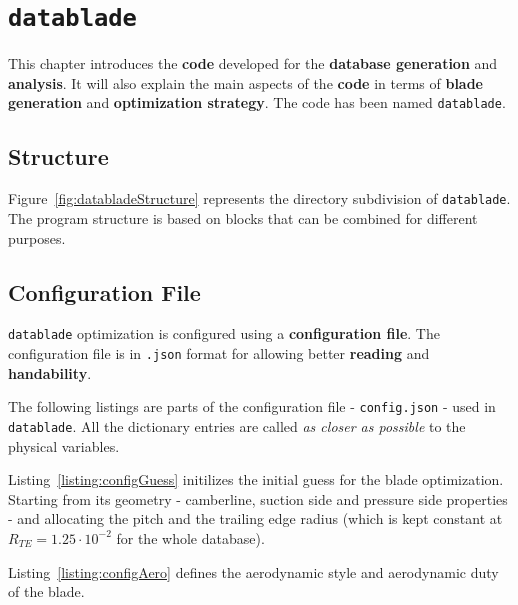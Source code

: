 \chapter{\texttt{datablade}}
\label{chapter:code}

This chapter introduces the \textbf{code} developed for the \textbf{database generation} and \textbf{analysis}. 
It will also explain the main aspects of the \textbf{code} in terms of \textbf{blade generation} and \textbf{optimization strategy}.
The code has been named \texttt{datablade}.

\section{Structure}

Figure~\ref{fig:databladeStructure} represents the directory subdivision of \texttt{datablade}. 
The program structure is based on blocks that can be combined for different purposes.  



\section{Configuration File}

\texttt{datablade} optimization is configured using a \textbf{configuration file}. The configuration file is in \texttt{.json} format for allowing better \textbf{reading} and \textbf{handability}.

The following listings are parts of the configuration file - \texttt{config.json} - used in  \texttt{datablade}. All the dictionary entries are called \textit{as closer as possible} to the physical variables.

Listing~\ref{listing:configGuess} initilizes the initial guess for the blade optimization. Starting from its geometry - camberline, suction side and pressure side properties - and 
allocating the pitch and the trailing edge radius (which is kept constant at $R_{TE} = 1.25 \cdot 10^{-2}$ for the whole database).



Listing~\ref{listing:configAero} defines the aerodynamic style and aerodynamic duty of the blade.



